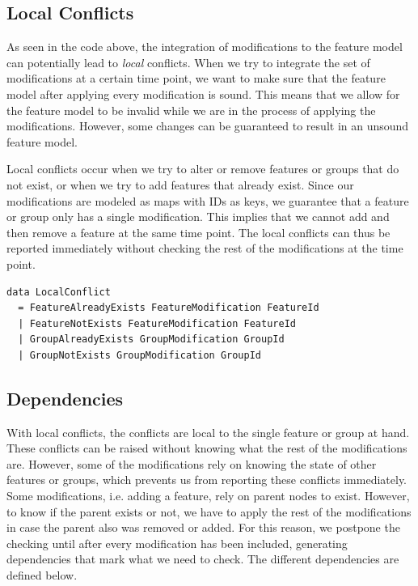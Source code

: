 \documentclass[a4paper,english]{ifimaster}
\begin{document}
\subsection{Local Conflicts}%
\label{sub:local_conflicts}

As seen in the code above, the integration of modifications to the feature model can potentially lead to \textit{local} conflicts. When we try to integrate the set of modifications at a certain time point, we want to make sure that the feature model after applying every modification is sound. This means that we allow for the feature model to be invalid while we are in the process of applying the modifications. However, some changes can be guaranteed to result in an unsound feature model.

Local conflicts occur when we try to alter or remove features or groups that do not exist, or when we try to add features that already exist. Since our modifications are modeled as maps with IDs as keys, we guarantee that a feature or group only has a single modification. This implies that we cannot add and then remove a feature at the same time point. The local conflicts can thus be reported immediately without checking the rest of the modifications at the time point.

\begin{verbatim}
data LocalConflict
  = FeatureAlreadyExists FeatureModification FeatureId
  | FeatureNotExists FeatureModification FeatureId
  | GroupAlreadyExists GroupModification GroupId
  | GroupNotExists GroupModification GroupId
\end{verbatim}

\subsection{Dependencies}%
\label{sub:dependencies}

With local conflicts, the conflicts are local to the single feature or group at hand. These conflicts can be raised without knowing what the rest of the modifications are. However, some of the modifications rely on knowing the state of other features or groups, which prevents us from reporting these conflicts immediately. Some modifications, i.e. adding a feature, rely on parent nodes to exist. However, to know if the parent exists or not, we have to apply the rest of the modifications in case the parent also was removed or added. For this reason, we postpone the checking until after every modification has been included, generating dependencies that mark what we need to check. The different dependencies are defined below.
\end{document}
